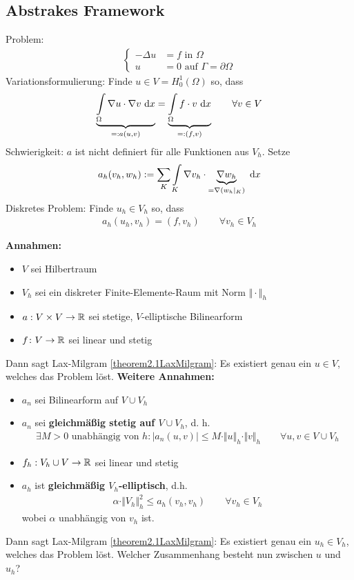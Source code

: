 \subsection{Abstrakes Framework}
Problem:
\begin{align*}
\left\lbrace\begin{array}{rl}
-\Delta u&=f\text{ in }\Omega\\
u&=0 \text{ auf }\Gamma=\partial\Omega
\end{array}\right.
\end{align*}
Variationsformulierung: Finde $u\in V=H_0^1(\Omega)$ so, dass
\begin{align*}
\underbrace{\int\limits_\Omega\nabla u\cdot\nabla v\text{ d} x}_{=:a(u,v)}=\underbrace{\int\limits_\Omega f\cdot v\text{ d} x}_{=:(f,v)}\qquad\forall v\in V
\end{align*}
Schwierigkeit: $a$ ist nicht definiert für alle Funktionen aus $V_h$. Setze
\begin{align*}
a_h(v_h,w_h):=\sum\limits_K\int\limits_K\nabla v_h\cdot\underbrace{\nabla w_h}_{=\nabla(w_h|_K)}\text{ d} x
\end{align*}
Diskretes Problem: Finde $u_h\in V_h$ so, dass
\begin{align*}
a_h(u_h,v_h)=(f,v_h)\qquad\forall v_h\in V_h
\end{align*}

\textbf{Annahmen:}
\begin{itemize}
\item $V$ sei Hilbertraum
\item $V_h$ sei ein diskreter Finite-Elemente-Raum mit Norm $\Vert\cdot\Vert_h$
\item $a:V\times V\to\mathbb{R}$ sei stetige, $V$-elliptische Bilinearform  
\item $f\colon V\to\mathbb{R}$ sei linear und stetig
\end{itemize}
Dann sagt Lax-Milgram \ref{theorem2.1LaxMilgram}: Es existiert genau ein $u\in V$, welches das Problem löst.\nl
\textbf{Weitere Annahmen:}
\begin{itemize}
\item $a_n$ sei Bilinearform auf $V\cup V_h$ %
\item $a_n$ sei \textbf{gleichmäßig stetig auf $V\cup V_h$}, d. h.
\begin{align*}
\exists M>0\text{ unabhängig von }h:\big|a_n(u,v)\big|\leq M\cdot\Vert u\Vert_h\cdot\Vert v\Vert_h\qquad\forall u,v\in V\cup V_h
\end{align*}
\item $f_h:V_h\cup V\to\mathbb{R}$ sei linear und stetig
\item $a_h$ ist \textbf{gleichmäßig $V_h$-elliptisch}, d.h.
\begin{align*}
\alpha\cdot\Vert V_h\Vert^2_h\leq a_h(v_h,v_h)\qquad\forall v_h\in V_h
\end{align*}
wobei $\alpha$ unabhängig von $v_h$ ist.
\end{itemize}
Dann sagt Lax-Milgram \ref{theorem2.1LaxMilgram}: Es existiert genau ein $u_h\in V_h$, welches das Problem löst. Welcher Zusammenhang besteht nun zwischen $u$ und $u_h$?

